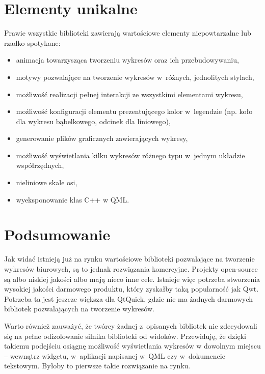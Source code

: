 \documentclass[11pt,twoside,a4paper,final]{llncs}
\begin{document}
\section{Elementy unikalne}
Prawie wszystkie biblioteki zawierają wartościowe elementy niepowtarzalne lub rzadko spotykane:
\begin{itemize}
\item{animacja towarzysząca tworzeniu wykresów oraz ich przebudowywaniu,}
\item{motywy pozwalające na tworzenie wykresów w~różnych, jednolitych stylach,}
\item{możliwość realizacji pełnej interakcji ze wszystkimi elementami wykresu,}
\item{możliwość konfiguracji elementu prezentującego kolor w~legendzie (np. koło dla wykresu bąbelkowego, odcinek dla liniowego),}
\item{generowanie plików graficznych zawierających wykresy,}
\item{możliwość wyświetlania kilku wykresów różnego typu w~jednym układzie współrzędnych,}
\item{nieliniowe skale osi,}
\item{wyeksponowanie klas C++ w QML.}
\end{itemize}

\section{Podsumowanie}
Jak widać istnieją już na rynku wartościowe biblioteki pozwalające na tworzenie wykresów biurowych, są to jednak rozwiązania komercyjne. Projekty open-source są albo niskiej jakości albo mają nieco inne cele. Istnieje więc potrzeba stworzenia wysokiej jakości darmowego produktu, który zyskałby taką popularność jak Qwt. Potrzeba ta jest jeszcze większa dla QtQuick, gdzie nie ma żadnych darmowych bibliotek pozwalających na tworzenie wykresów.\newline

Warto również zauważyć, że twórcy żadnej z~opisanych bibliotek nie zdecydowali się na pełne odizolowanie silnika biblioteki od widoków. Przewiduję, że dzięki takiemu podejściu osiągnę możliwość wyświetlania wykresów w dowolnym miejscu -- wewnątrz widgetu, w~aplikacji napisanej w~QML czy w~dokumencie tekstowym. Byłoby to pierwsze takie rozwiązanie na rynku.
\end{document}
